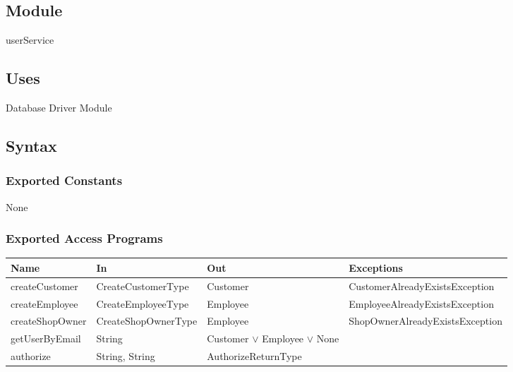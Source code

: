 \documentclass[12pt, titlepage]{article}
\begin{document}
\subsection{Module}

userService

\subsection{Uses}

Database Driver Module

\subsection{Syntax}

\subsubsection{Exported Constants}

None






\subsubsection{Exported Access Programs}

\begin{center}
	\begin{adjustbox}{width=\textwidth}
		\begin{tabular}{llll}
			\hline
			\textbf{Name}   & \textbf{In}         & \textbf{Out}                         & \textbf{Exceptions}             \\
			\hline
			createCustomer  & CreateCustomerType  & Customer                             & CustomerAlreadyExistsException  \\
			createEmployee  & CreateEmployeeType  & Employee                             & EmployeeAlreadyExistsException  \\
			createShopOwner & CreateShopOwnerType & Employee                             & ShopOwnerAlreadyExistsException \\
			getUserByEmail  & String              & Customer $\lor$ Employee $\lor$ None & ~                               \\
			authorize       & String, String      & AuthorizeReturnType                  & ~                               \\
			\hline
		\end{tabular}
	\end{adjustbox}
\end{center}
\end{document}
